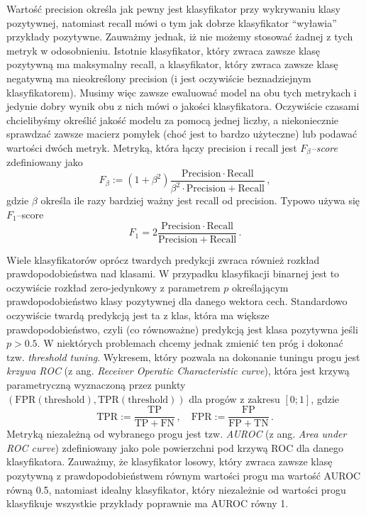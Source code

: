 \documentclass{myclass}
\numberwithin{equation}{subsection}
\begin{document}
Wartość precision określa jak pewny jest klasyfikator przy wykrywaniu klasy pozytywnej, natomiast
recall mówi o tym jak dobrze klasyfikator \enquote{wyławia} przykłady pozytywne. Zauważmy jednak, iż
nie możemy stosować żadnej z tych metryk w odosobnieniu. Istotnie klasyfikator, który zwraca zawsze
klasę pozytywną ma maksymalny recall, a klasyfikator, który zwraca zawsze klasę negatywną ma
nieokreślony precision (i jest oczywiście beznadziejnym klasyfikatorem). Musimy więc zawsze
ewaluować model na obu tych metrykach i jedynie dobry wynik obu z nich mówi o jakości klasyfikatora.
Oczywiście czasami chcielibyśmy określić jakość modelu za pomocą jednej liczby, a niekoniecznie
sprawdzać zawsze macierz pomyłek (choć jest to bardzo użyteczne) lub podawać wartości dwóch metryk.
Metryką, która łączy precision i recall jest \emph{\(F_\beta\)--score} zdefiniowany jako
\[
F_\beta := (1 + \beta^2) \frac{\mathrm{Precision} \cdot \mathrm{Recall}}{\beta^2 \cdot \mathrm{Precision} + \mathrm{Recall}}\,, 
\]
gdzie \(\beta\) określa ile razy bardziej ważny jest recall od precision. Typowo używa się
\(F_1\)--score
\[
F_1 = 2\frac{\mathrm{Precision} \cdot \mathrm{Recall}}{\mathrm{Precision} + \mathrm{Recall}}\,. 
\]

Wiele klasyfikatorów oprócz twardych predykcji zwraca również rozkład prawdopodobieństwa nad
klasami. W przypadku klasyfikacji binarnej jest to oczywiście rozkład zero-jedynkowy z parametrem
\(p\) określającym prawdopodobieństwo klasy pozytywnej dla danego wektora cech. Standardowo
oczywiście twardą predykcją jest ta z klas, która ma większe prawdopodobieństwo, czyli (co
równoważne) predykcją jest klasa pozytywna jeśli \(p > 0.5\). W niektórych problemach chcemy jednak
zmienić ten próg i dokonać tzw. \textit{threshold tuning}. Wykresem, który pozwala na dokonanie
tuningu progu jest \emph{krzywa ROC} (z ang. \textit{Receiver Operatic Characteristic curve}), która
jest krzywą parametryczną wyznaczoną przez punkty \((\mathrm{FPR}(\mathrm{threshold}),
\mathrm{TPR}(\mathrm{threshold}))\) dla progów z zakresu \([0;1]\), gdzie
\[
\mathrm{TPR} := \frac{\mathrm{TP}}{\mathrm{TP + FN}}\,,\quad \mathrm{FPR} := \frac{\mathrm{FP}}{\mathrm{FP + TN}}\,.
\]
Metryką niezależną od wybranego progu jest tzw. \emph{AUROC} (z ang. \textit{Area under ROC curve})
zdefiniowany jako pole powierzchni pod krzywą ROC dla danego klasyfikatora. Zauważmy, że
klasyfikator losowy, który zwraca zawsze klasę pozytywną z prawdopodobieństwem równym wartości progu
ma wartość AUROC równą 0.5, natomiast idealny klasyfikator, który niezależnie od wartości progu
klasyfikuje wszystkie przykłady poprawnie ma AUROC równy 1.
\end{document}
